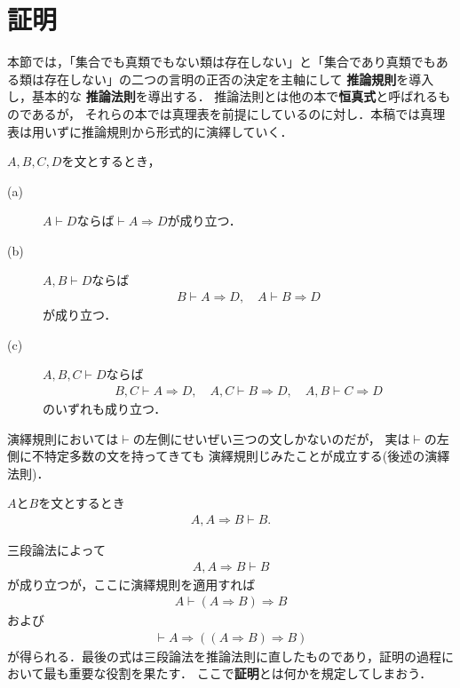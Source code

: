 \section{証明}
	本節では，「集合でも真類でもない類は存在しない」と「集合であり真類でもある類は存在しない」の二つの言明の正否の決定を主軸にして
	{\bf 推論規則}を導入し，基本的な
	{\bf 推論法則}を導出する．
	推論法則とは他の本で{\bf 恒真式}と呼ばれるものであるが，
	それらの本では真理表を前提にしているのに対し．本稿では真理表は用いずに推論規則から形式的に演繹していく．
	\begin{screen}
		\begin{logicalaxm}[演繹規則]
			$A,B,C,D$を文とするとき，
			\begin{description}
				\item[(a)] $A \vdash D$ならば$\vdash A \Longrightarrow D$が成り立つ．
				\item[(b)] $A,B \vdash D$ならば
					\begin{align}
						B \vdash A \Longrightarrow D,\quad
						A \vdash B \Longrightarrow D
					\end{align}
					が成り立つ．
				\item[(c)] $A,B,C \vdash D$ならば
					\begin{align}
						B,C \vdash A \Longrightarrow D,\quad
						A,C \vdash B \Longrightarrow D,\quad
						A,B \vdash C \Longrightarrow D
					\end{align}
					のいずれも成り立つ．
			\end{description}
		\end{logicalaxm}
	\end{screen}
	
	演繹規則においては$\vdash$の左側にせいぜい三つの文しかないのだが，
	実は$\vdash$の左側に不特定多数の文を持ってきても
	演繹規則じみたことが成立する(後述の演繹法則)．
	
	\begin{screen}
		\begin{logicalaxm}[三段論法]
			$A$と$B$を文とするとき
			\begin{align}
				A,A \Longrightarrow B \vdash B.
			\end{align}
		\end{logicalaxm}
	\end{screen}
	
	三段論法によって
	\begin{align}
		A,A \Longrightarrow B \vdash B
	\end{align}
	が成り立つが，ここに演繹規則を適用すれば
	\begin{align}
		A \vdash (A \Longrightarrow B) \Longrightarrow B
	\end{align}
	および
	\begin{align}
		\vdash A \Longrightarrow ((A \Longrightarrow B) \Longrightarrow B)
	\end{align}
	が得られる．最後の式は三段論法を推論法則に直したものであり，証明の過程において最も重要な役割を果たす．
	ここで{\bf 証明}とは何かを規定してしまおう．
	
